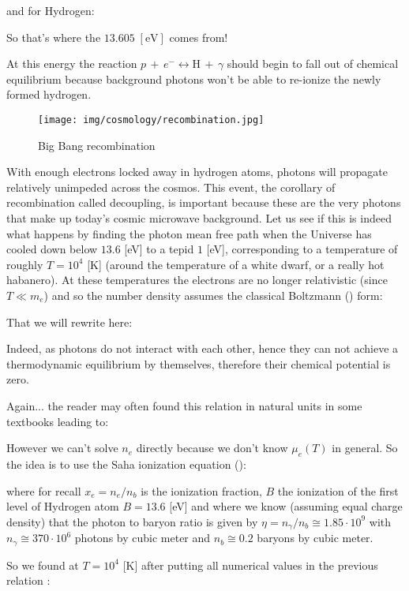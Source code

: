 	and for Hydrogen:
	
	So that's where the $13.605\;[\text{eV}]$ comes from!
	
	At this energy the reaction $p\, +\, e^{-}\longleftrightarrow \mathrm{H}\, +\, \gamma$ should begin to fall out of chemical equilibrium because background photons won't be able to re-ionize the newly formed hydrogen.
	\begin{figure}[H]
		\centering
		\texttt{[image: img/cosmology/recombination.jpg]}
		\caption{Big Bang recombination}
	\end{figure}	
	With enough electrons locked away in hydrogen atoms, photons will propagate relatively unimpeded across the cosmos. This event, the corollary of recombination called decoupling, is important because these are the very photons that make up today's cosmic microwave background. Let us see if this is indeed what happens by finding the photon mean free path when the Universe has cooled down below $13.6$ [eV] to a tepid $1$ [eV], corresponding to a temperature of roughly $T=10^4$ [K] (around the temperature of a white dwarf, or a really hot habanero). At these temperatures the electrons are no longer relativistic (since $T \ll m_e$) and so the number density assumes the classical Boltzmann () form:
	
	That we will rewrite here:
	
	Indeed, as photons do not interact with each other, hence they can not achieve a thermodynamic equilibrium by themselves, therefore their chemical potential is zero.
	
	Again... the reader may often found this relation in natural units in some textbooks leading to:
	
	However we can't solve $n_e$ directly because we don't know $\mu_e(T)$ in general. So the idea is to use the Saha ionization equation ():
	
	where for recall $x_{e}=n_{e} / n_{b}$ is the ionization fraction, $B$ the ionization of the first level of Hydrogen atom $B= 13.6$ [eV] and where we know (assuming equal charge density) that the photon to baryon ratio is given by $\eta=n_\gamma/n_b\cong 1.85\cdot 10^{9}$ with $n_\gamma\cong 370\cdot 10^{6}$ photons by cubic meter and $n_b\cong 0.2$ baryons by cubic meter.
	
	So we found at $T=10^4$ [K] after putting all numerical values in the previous relation :
	
